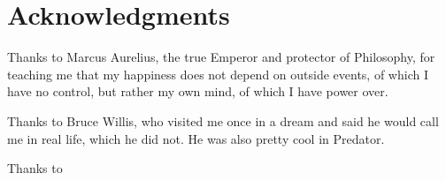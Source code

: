 \section*{Acknowledgments} %


Thanks to Marcus Aurelius, the true Emperor and protector of Philosophy, for teaching me that my happiness does not depend on outside events, of which I have no control, but rather my own mind, of which I have power over.


Thanks to Bruce Willis, who visited me once in a dream and said he would call me in real life, which he did not. He was also pretty cool in Predator.


Thanks to 